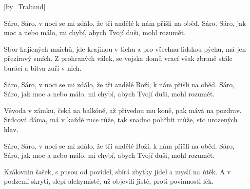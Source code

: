 [by={Traband}]

\beginchorus{}
Sáro, Sáro, v noci se mi zdálo,
že tři andělé k nám přišli na oběd.
Sáro, Sáro, jak moc a nebo málo,
mi chybí, abych Tvojí duši, mohl rozumět.
\endchorus{}

\beginverse{}
Sbor kajícných mnichů, jde krajinou v tichu
a pro všechnu lidskou pýchu, má jen přezíravý smích.
Z prohraných válek, se vojska domů vrací
však zbraně stále burácí a bitva zuří v nich.
\endverse{}

\beginchorus{}
Sáro, Sáro, v noci se mi zdálo,
že tři andělé Boží, k nám přišli na oběd.
Sáro, Sáro, jak moc a nebo málo,
mi chybí, abych Tvojí duši, mohl rozumět.
\endchorus{}

\beginverse{}
Vévoda v zámku, čeká na balkóně,
až přivedou mu koně, pak mává na pozdrav.
Srdcová dáma, má v každé ruce růže,
tak snadno pohřbít může, sto urozených hlav.
\endverse{}

\beginchorus{}
Sáro, Sáro, v noci se mi zdálo,
že tři andělé Boží, k nám přišli na oběd.
Sáro, Sáro, jak moc a nebo málo,
mi chybí, abych Tvojí duši, mohl rozumět.
\endchorus{}

\beginverse{}
Královnin šašek, s pusou od povidel,
sbírá zbytky jídel a myslí na útěk.
A v podzemí skrytí, slepí alchymisté,
už objevili jistě, proti povinnosti lék.
\endverse{}

